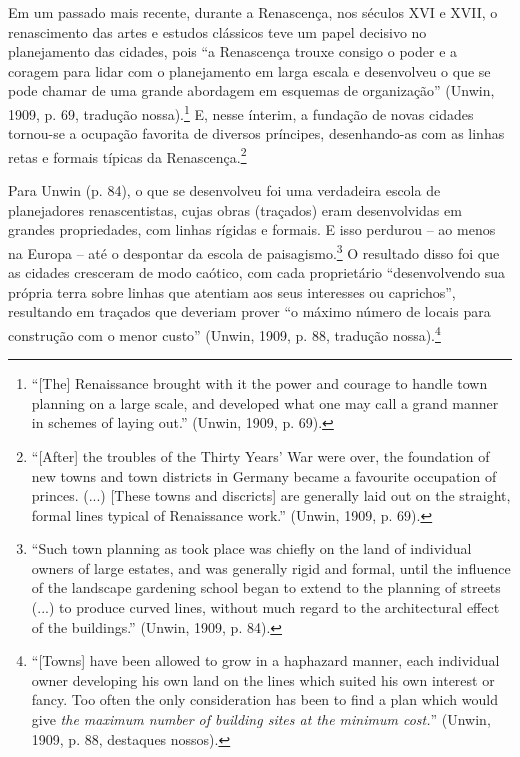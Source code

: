 \documentclass[12pt, a4paper]{book} %
\begin{document}
        Em um passado mais recente, durante a Renascença, nos séculos XVI e XVII, o renascimento das artes e estudos clássicos teve um papel decisivo no planejamento das cidades, pois ``a Renascença trouxe consigo o poder e a coragem para lidar com o planejamento em larga escala e desenvolveu o que se pode chamar de uma grande abordagem em esquemas de organização'' (Unwin, 1909, p. 69, tradução nossa).\footnote[5]{``[The] Renaissance brought with it the power and courage to handle town planning on a large scale, and developed what one may call a grand manner in schemes of laying out.'' (Unwin, 1909, p. 69).} E, nesse ínterim, a fundação de novas cidades tornou-se a ocupação favorita de diversos príncipes, desenhando-as com as linhas retas e formais típicas da Renascença.\footnote[6]{``[After] the troubles of the Thirty Years' War were over, the foundation of new towns and town districts in Germany became a favourite occupation of princes. (...) [These towns and discricts] are generally laid out on the straight, formal lines typical of Renaissance work.'' (Unwin, 1909, p. 69).}

        Para Unwin (p. 84), o que se desenvolveu foi uma verdadeira escola de planejadores renascentistas, cujas obras (traçados) eram desenvolvidas em grandes propriedades, com linhas rígidas e formais. E isso perdurou – ao menos na Europa – até o despontar da escola de paisagismo.\footnote[7]{``Such town planning as took place was chiefly on the land of individual owners of large estates, and was generally rigid and formal, until the influence of the landscape gardening school began to extend to the planning of streets (...) to produce curved lines, without much regard to the architectural effect of the buildings.'' (Unwin, 1909, p. 84).} O resultado disso foi que as cidades cresceram de modo caótico, com cada proprietário ``desenvolvendo sua própria terra sobre linhas que atentiam aos seus interesses ou caprichos'', resultando em traçados que deveriam prover ``o máximo número de locais para construção com o menor custo'' (Unwin, 1909, p. 88, tradução nossa).\footnote[8]{``[Towns] have been allowed to grow in a haphazard manner, each individual owner developing his own land on the lines which suited his own interest or fancy. Too often the only consideration has been to find a plan which would give \textit{the maximum number of building sites at the minimum cost.}'' (Unwin, 1909, p. 88, destaques nossos).}
\end{document}
